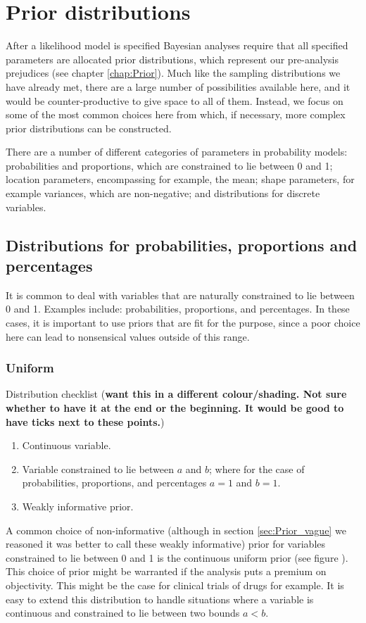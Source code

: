 \documentclass[11pt,fullpage]{book}
\begin{document}
\section{Prior distributions}
After a likelihood model is specified Bayesian analyses require that all specified parameters are allocated prior distributions, which represent our pre-analysis prejudices (see chapter \ref{chap:Prior}). Much like the sampling distributions we have already met, there are a large number of possibilities available here, and it would be counter-productive to give space to all of them. Instead, we focus on some of the most common choices here from which, if necessary, more complex prior distributions can be constructed. 

There are a number of different categories of parameters in probability models: probabilities and proportions, which are constrained to lie between 0 and 1; location parameters, encompassing for example, the mean; shape parameters, for example variances, which are non-negative; and distributions for discrete variables. 


\subsection{Distributions for probabilities, proportions and percentages}
It is common to deal with variables that are naturally constrained to lie between 0 and 1. Examples include: probabilities, proportions, and percentages. In these cases, it is important to use priors that are fit for the purpose, since a poor choice here can lead to nonsensical values outside of this range.

\subsubsection{Uniform}
Distribution checklist (\textbf{want this in a different colour/shading. Not sure whether to have it at the end or the beginning. It would be good to have ticks next to these points.})

\begin{enumerate} 
\item Continuous variable.
\item Variable constrained to lie between $a$ and $b$; where for the case of probabilities, proportions, and percentages $a=1$ and $b=1$.
\item Weakly informative prior.
\end{enumerate}

A common choice of non-informative (although in section \ref{sec:Prior_vague} we reasoned it was better to call these weakly informative) prior for variables constrained to lie between 0 and 1 is the continuous uniform prior (see figure ). This choice of prior might be warranted if the analysis puts a premium on objectivity. This might be the case for clinical trials of drugs for example. It is easy to extend this distribution to handle situations where a variable is continuous and constrained to lie between two bounds $a<b$.
\end{document}

